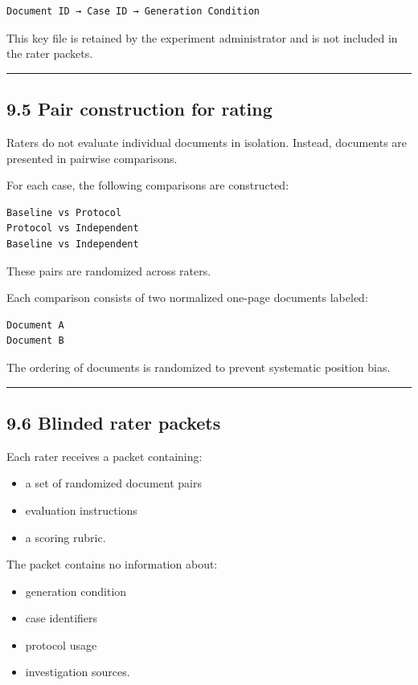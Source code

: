 {\begin{verbatim}
Document ID → Case ID → Generation Condition
\end{verbatim}

This key file is retained by the experiment administrator and is not included in the rater packets.

\noindent\rule{\textwidth}{0.4pt}

\subsection*{9.5 Pair construction for rating}

Raters do not evaluate individual documents in isolation. Instead, documents are presented in pairwise comparisons.

For each case, the following comparisons are constructed:

\begin{verbatim}
Baseline vs Protocol
Protocol vs Independent
Baseline vs Independent
\end{verbatim}

These pairs are randomized across raters.

Each comparison consists of two normalized one-page documents labeled:

\begin{verbatim}
Document A
Document B
\end{verbatim}

The ordering of documents is randomized to prevent systematic position bias.

\noindent\rule{\textwidth}{0.4pt}

\subsection*{9.6 Blinded rater packets}

Each rater receives a packet containing:

\begin{itemize}
\item a set of randomized document pairs
\item evaluation instructions
\item a scoring rubric.
\end{itemize}

The packet contains no information about:

\begin{itemize}
\item generation condition
\item case identifiers
\item protocol usage
\item investigation sources.
\end{itemize}

}
